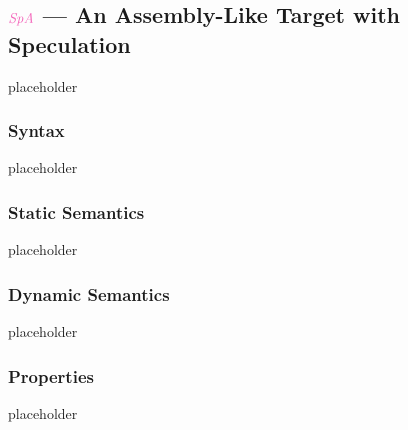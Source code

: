 \subsection{$\ird{SpA}$ --- An Assembly-Like Target with Speculation}\label{subsec-spa}
placeholder
\subsubsection{Syntax}\label{subsec-spa-syntax}
placeholder
\subsubsection{Static Semantics}\label{subsec-spa-static}
placeholder
\subsubsection{Dynamic Semantics}\label{subsec-spa-dynamic}
placeholder
\subsubsection{Properties}\label{subsec-spa-properties}
placeholder
